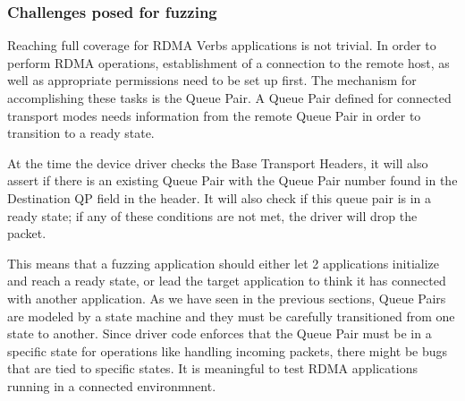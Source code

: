 \subsubsection{Challenges posed for fuzzing}\label{s:ibverbs-challenges}

Reaching full coverage for RDMA Verbs applications is not trivial. In order to perform RDMA operations, establishment of
a connection to the remote host, as well as appropriate permissions need to be set up first. The mechanism for accomplishing
these tasks is the Queue Pair\cite{rdmamanual}. A Queue Pair defined for connected transport modes needs information from
the remote Queue Pair in order to transition to a ready state.

At the time the device driver checks the Base Transport Headers, it will also assert if there is an existing Queue Pair
with the Queue Pair number found in the Destination QP field in the header.
It will also check if this queue pair is in a ready state; if any of these conditions
are not met, the driver will drop the packet.

This means that a fuzzing application should either let 2 applications initialize and reach a ready state,
or lead the target application to think it has connected with another application. As we have seen
in the previous sections, Queue Pairs are modeled by a state machine and they must be carefully transitioned from one
state to another. Since driver code enforces that the Queue Pair must be in a specific state for operations like
handling incoming packets, there might be bugs that are tied to specific states. It is meaningful to test
RDMA applications running in a connected environmnent.







